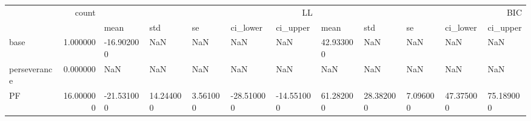 \begin{tabular}{lrllllllllll}
\toprule
 & count & \multicolumn{5}{r}{LL} & \multicolumn{5}{r}{BIC} \\
 &  & mean & std & se & ci_lower & ci_upper & mean & std & se & ci_lower & ci_upper \\
\midrule
base & 1.000000 & -16.902000 & NaN & NaN & NaN & NaN & 42.933000 & NaN & NaN & NaN & NaN \\
perseverance & 0.000000 & NaN & NaN & NaN & NaN & NaN & NaN & NaN & NaN & NaN & NaN \\
PF & 16.000000 & -21.531000 & 14.244000 & 3.561000 & -28.510000 & -14.551000 & 61.282000 & 28.382000 & 7.096000 & 47.375000 & 75.189000 \\
\bottomrule
\end{tabular}
